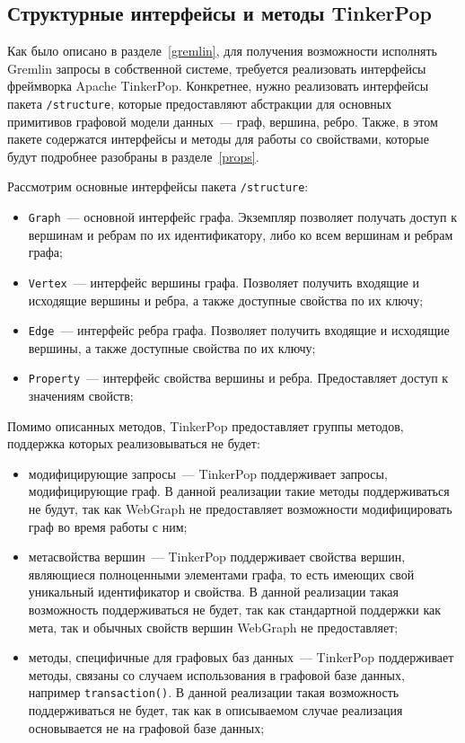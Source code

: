 \documentclass[times,specification,annotation]{itmo-student-thesis}
\begin{document}
\subsection{Структурные интерфейсы и методы TinkerPop}\label{tinkerpop-structure}

Как было описано в разделе~\ref{gremlin}, для получения возможности исполнять Gremlin запросы в собственной системе, требуется реализовать интерфейсы фреймворка Apache TinkerPop. Конкретнее, нужно реализовать интерфейсы пакета \texttt{/structure}, которые предоставляют абстракции для основных примитивов графовой модели данных~--- граф, вершина, ребро. Также, в этом пакете содержатся интерфейсы и методы для работы со свойствами, которые будут подробнее разобраны в разделе~\ref{props}.

Рассмотрим основные интерфейсы пакета \texttt{/structure}:

\begin{itemize}
    \item \texttt{Graph}~--- основной интерфейс графа. Экземпляр позволяет получать доступ к вершинам и ребрам по их идентификатору, либо ко всем вершинам и ребрам графа;
    \item \texttt{Vertex}~--- интерфейс вершины графа. Позволяет получить входящие и исходящие вершины и ребра, а также доступные свойства по их ключу;
    \item \texttt{Edge}~--- интерфейс ребра графа. Позволяет получить входящие и исходящие вершины, а также доступные свойства по их ключу;
    \item \texttt{Property}~--- интерфейс свойства вершины и ребра. Предоставляет доступ к значениям свойств;
\end{itemize}

Помимо описанных методов, TinkerPop предоставляет группы методов, поддержка которых реализовываться не будет:

\begin{itemize}
    \item модифицирующие запросы~--- TinkerPop поддерживает запросы, модифицирующие граф. В данной реализации такие методы поддерживаться не будут, так как WebGraph не предоставляет возможности модифицировать граф во время работы с ним;
    \item метасвойства вершин~--- TinkerPop поддерживает свойства вершин, являющиеся полноценными элементами графа, то есть имеющих свой уникальный идентификатор и свойства. В данной реализации такая возможность поддерживаться не будет, так как стандартной поддержки как мета, так и обычных свойств вершин WebGraph не предоставляет;
    \item методы, специфичные для графовых баз данных~--- TinkerPop поддерживает методы, связаны со случаем использования в графовой базе данных, например \texttt{transaction()}. В данной реализации такая возможность поддерживаться не будет, так как в описываемом случае реализация основывается не на графовой базе данных;
\end{itemize}
\end{document}

